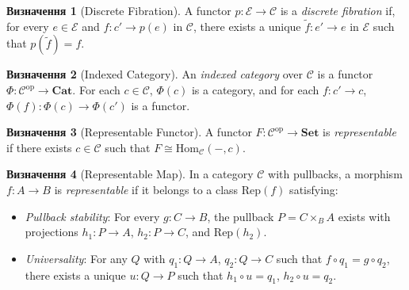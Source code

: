 \documentclass{article}
\theoremstyle{definition}
\newtheorem{definition}{Визначення}[section]
\begin{document}
\begin{definition}[Discrete Fibration]
A functor \(p : \mathcal{E} \to \mathcal{C}\) is a \emph{discrete fibration} if, for every \(e \in \mathcal{E}\) and \(f : c' \to p(e)\) in \(\mathcal{C}\), there exists a unique \(\tilde{f} : e' \to e\) in \(\mathcal{E}\) such that \(p(\tilde{f}) = f\).
\end{definition}

\begin{definition}[Indexed Category]
An \emph{indexed category} over \(\mathcal{C}\) is a functor \(\Phi : \mathcal{C}^{\mathrm{op}} \to \mathbf{Cat}\). For each \(c \in \mathcal{C}\), \(\Phi(c)\) is a category, and for each \(f : c' \to c\), \(\Phi(f) : \Phi(c) \to \Phi(c')\) is a functor.
\end{definition}

\begin{definition}[Representable Functor]
A functor \(F : \mathcal{C}^{\mathrm{op}} \to \mathbf{Set}\) is \emph{representable} if there exists \(c \in \mathcal{C}\) such that \(F \cong \mathrm{Hom}_{\mathcal{C}}(-, c)\).
\end{definition}

\begin{definition}[Representable Map]
In a category \(\mathcal{C}\) with pullbacks, a morphism \(f : A \to B\) is \emph{representable} if it belongs to a class \(\mathrm{Rep}(f)\) satisfying:
\begin{itemize}
    \item \emph{Pullback stability}: For every \(g : C \to B\), the pullback \(P = C \times_B A\) exists with projections \(h_1 : P \to A\), \(h_2 : P \to C\), and \(\mathrm{Rep}(h_2)\).
    \item \emph{Universality}: For any \(Q\) with \(q_1 : Q \to A\), \(q_2 : Q \to C\) such that \(f \circ q_1 = g \circ q_2\), there exists a unique \(u : Q \to P\) such that \(h_1 \circ u = q_1\), \(h_2 \circ u = q_2\).
\end{itemize}
\end{definition}

\end{document}
